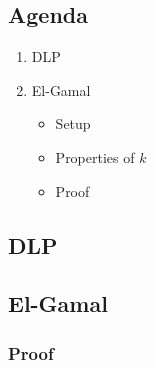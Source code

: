 

\subsection*{Agenda}
\begin{enumerate}
\item DLP
\item El-Gamal
  \begin{itemize}
  \item Setup
  \item Properties of $k$
  \item Proof
  \end{itemize}
\end{enumerate}

\subsection{DLP}


\subsection{El-Gamal}

\subsubsection*{Proof}

